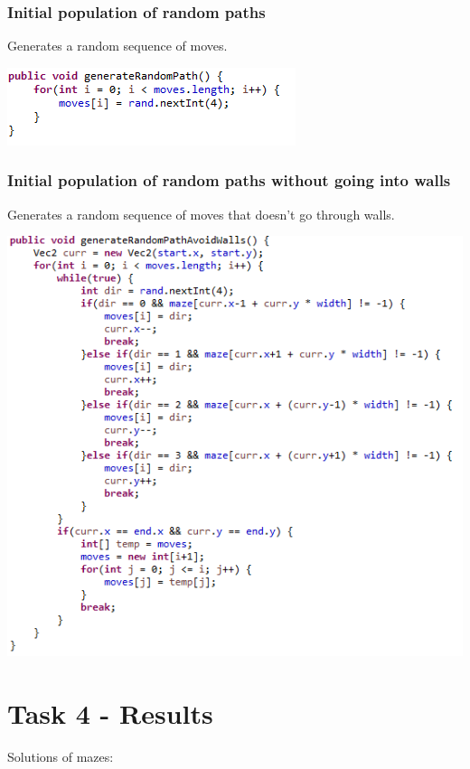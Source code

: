 \documentclass[12pt]{article} %
\begin{document}
\subsubsection{Initial population of random paths}
Generates a random sequence of moves.

\includegraphics[scale=1]{generationRandomInitialPopulation}

\subsubsection{Initial population of random paths without going into walls}
Generates a random sequence of moves that doesn't go through walls.

\includegraphics[scale=1]{generationRandomInitialPopulationAvoidWalls}

\section{Task 4 - Results}
Solutions of mazes:
\end{document}
